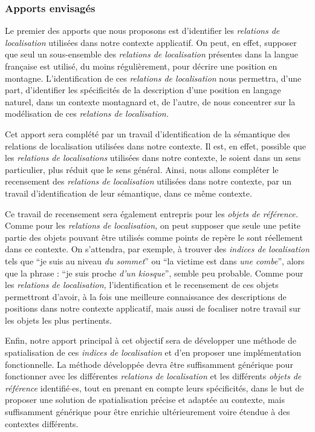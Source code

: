 \subsubsection{Apports envisagés}

Le premier des apports que nous proposons est d'identifier les
\emph{relations de localisation} utilisées dans notre contexte
applicatif. On peut, en effet, supposer que seul un sous-ensemble des
\emph{relations de localisation} présentes dans la langue française
est utilisé, du moins régulièrement, pour décrire une position en
montagne. L'identification de ces \emph{relations de localisation}
nous permettra, d'une part, d'identifier les spécificités de la
description d'une position en langage naturel, dans un contexte
montagnard et, de l'autre, de nous concentrer sur la modélisation de
ces \emph{relations de localisation.}

Cet apport sera complété par un travail d'identification de la
sémantique des relations de localisation utilisées dans notre
contexte. Il est, en effet, possible que les \emph{relations de
  localisations} utilisées dans notre contexte, le soient dans un sens
particulier, plus réduit que le sens général. Ainsi, nous allons
compléter le recensement des \emph{relations de localisation}
utilisées dans notre contexte, par un travail d'identification de leur
sémantique, dans ce même contexte.

Ce travail de recensement sera également entrepris pour les
\emph{objets de référence.} Comme pour les \emph{relations de
  localisation,} on peut supposer que seule une petite partie des
objets pouvant être utilisés comme points de repère le sont réellement
dans ce contexte. On s'attendra, par exemple, à trouver des
\emph{indices de localisation} tels que \enquote{je suis au niveau
  \emph{du sommet}} ou \enquote{la victime est dans \emph{une combe}},
alors que la phrase : \enquote{je suis proche \emph{d'un kiosque}},
semble peu probable. Comme pour les \emph{relations de localisation,}
l'identification et le recensement de ces objets permettront d'avoir,
à la fois une meilleure connaissance des descriptions de positions
dans notre contexte applicatif, mais aussi de focaliser notre travail
sur les objets les plus pertinents.

Enfin, notre apport principal à cet objectif sera de développer une
méthode de spatialisation de ces \emph{indices de localisation} et
d'en proposer une implémentation fonctionnelle. La méthode développée
devra être suffisamment générique pour fonctionner avec les
différentes \emph{relations de localisation} et les différents
\emph{objets de référence} identifié$\cdot$es, tout en prenant en
compte leurs spécificités, dans le but de proposer une solution de
spatialisation précise et adaptée au contexte, mais suffisamment
générique pour être enrichie ultérieurement voire étendue à des
contextes différents.


